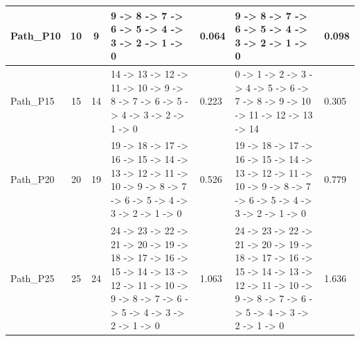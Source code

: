 \documentclass[8pt]{article}
\begin{document}
\begin{longtable}{@{}L{3.2cm} c c L{4cm} L{1.2cm} L{4cm} L{1.2cm}@{}}
\midrule
Path\_P10 & 10 & 9 & 9 -\textgreater{} 8 -\textgreater{} 7 -\textgreater{} 6 -\textgreater{} 5 -\textgreater{} 4 -\textgreater{} 3 -\textgreater{} 2 -\textgreater{} 1 -\textgreater{} 0 & 0.064 & 9 -\textgreater{} 8 -\textgreater{} 7 -\textgreater{} 6 -\textgreater{} 5 -\textgreater{} 4 -\textgreater{} 3 -\textgreater{} 2 -\textgreater{} 1 -\textgreater{} 0 & 0.098 \\
\midrule
Path\_P15 & 15 & 14 & 14 -\textgreater{} 13 -\textgreater{} 12 -\textgreater{} 11 -\textgreater{} 10 -\textgreater{} 9 -\textgreater{} 8 -\textgreater{} 7 -\textgreater{} 6 -\textgreater{} 5 -\textgreater{} 4 -\textgreater{} 3 -\textgreater{} 2 -\textgreater{} 1 -\textgreater{} 0 & 0.223 & 0 -\textgreater{} 1 -\textgreater{} 2 -\textgreater{} 3 -\textgreater{} 4 -\textgreater{} 5 -\textgreater{} 6 -\textgreater{} 7 -\textgreater{} 8 -\textgreater{} 9 -\textgreater{} 10 -\textgreater{} 11 -\textgreater{} 12 -\textgreater{} 13 -\textgreater{} 14 & 0.305 \\
\midrule
Path\_P20 & 20 & 19 & 19 -\textgreater{} 18 -\textgreater{} 17 -\textgreater{} 16 -\textgreater{} 15 -\textgreater{} 14 -\textgreater{} 13 -\textgreater{} 12 -\textgreater{} 11 -\textgreater{} 10 -\textgreater{} 9 -\textgreater{} 8 -\textgreater{} 7 -\textgreater{} 6 -\textgreater{} 5 -\textgreater{} 4 -\textgreater{} 3 -\textgreater{} 2 -\textgreater{} 1 -\textgreater{} 0 & 0.526 & 19 -\textgreater{} 18 -\textgreater{} 17 -\textgreater{} 16 -\textgreater{} 15 -\textgreater{} 14 -\textgreater{} 13 -\textgreater{} 12 -\textgreater{} 11 -\textgreater{} 10 -\textgreater{} 9 -\textgreater{} 8 -\textgreater{} 7 -\textgreater{} 6 -\textgreater{} 5 -\textgreater{} 4 -\textgreater{} 3 -\textgreater{} 2 -\textgreater{} 1 -\textgreater{} 0 & 0.779 \\
\midrule
Path\_P25 & 25 & 24 & 24 -\textgreater{} 23 -\textgreater{} 22 -\textgreater{} 21 -\textgreater{} 20 -\textgreater{} 19 -\textgreater{} 18 -\textgreater{} 17 -\textgreater{} 16 -\textgreater{} 15 -\textgreater{} 14 -\textgreater{} 13 -\textgreater{} 12 -\textgreater{} 11 -\textgreater{} 10 -\textgreater{} 9 -\textgreater{} 8 -\textgreater{} 7 -\textgreater{} 6 -\textgreater{} 5 -\textgreater{} 4 -\textgreater{} 3 -\textgreater{} 2 -\textgreater{} 1 -\textgreater{} 0 & 1.063 & 24 -\textgreater{} 23 -\textgreater{} 22 -\textgreater{} 21 -\textgreater{} 20 -\textgreater{} 19 -\textgreater{} 18 -\textgreater{} 17 -\textgreater{} 16 -\textgreater{} 15 -\textgreater{} 14 -\textgreater{} 13 -\textgreater{} 12 -\textgreater{} 11 -\textgreater{} 10 -\textgreater{} 9 -\textgreater{} 8 -\textgreater{} 7 -\textgreater{} 6 -\textgreater{} 5 -\textgreater{} 4 -\textgreater{} 3 -\textgreater{} 2 -\textgreater{} 1 -\textgreater{} 0 & 1.636 \\

\end{longtable}
\end{document}
